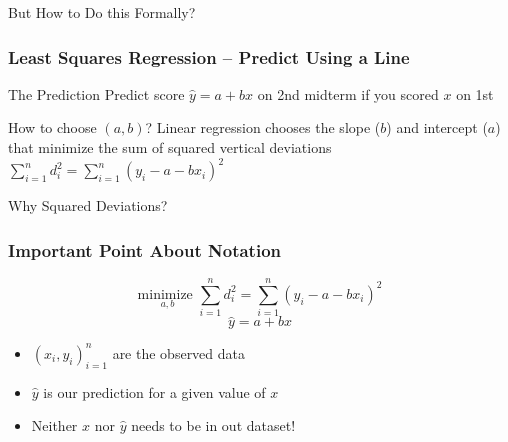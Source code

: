 \begin{frame}

\centering \Huge But How to Do this Formally?


\end{frame}
\begin{frame}
\frametitle{Least Squares Regression -- Predict Using a Line}

\begin{block}{The Prediction}
Predict score $\hat{y} = a + b x$ on 2nd midterm if you scored $x$ on 1st
\end{block}

\begin{block}{How to choose $(a,b)$?}
  Linear regression chooses the slope ($b$) and intercept ($a$) that \alert{minimize the sum of squared vertical deviations}
$\displaystyle\sum_{i = 1}^n d_i^2 = \sum_{i=1}^n (y_i - a - b x_i)^2$
\end{block}

\begin{block}{Why Squared Deviations?}
\end{block}
\end{frame}
\begin{frame}
	\frametitle{Important Point About Notation}
  $$\boxed{\underset{a,b}{\mbox{minimize }}\sum_{i = 1}^n d_i^2 = \sum_{i=1}^n (y_i - a - b x_i)^2}$$
			$$\boxed{\hat{y} = a + bx}$$
		\begin{itemize}
		\item $(x_i, y_i)_{i=1}^n$ are the \alert{observed data}
		\item $\widehat{y}$ is our \alert{prediction} for a given value of $x$
		\item Neither $x$ nor $\widehat{y}$ needs to be in out dataset!
	\end{itemize}
\end{frame}
